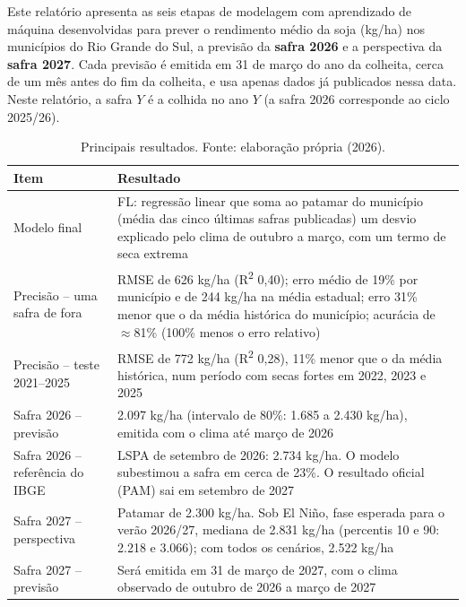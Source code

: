 \documentclass[12pt]{article}
\begin{document}
Este relatório apresenta as seis etapas de modelagem com aprendizado de
máquina desenvolvidas para prever o rendimento médio da soja (kg/ha) nos
municípios do Rio Grande do Sul, a previsão da \textbf{safra 2026} e a
perspectiva da \textbf{safra 2027}. Cada previsão é emitida em 31 de março
do ano da colheita, cerca de um mês antes do fim da colheita, e usa apenas
dados já publicados nessa data. Neste relatório, a safra $Y$ é a colhida no
ano $Y$ (a safra 2026 corresponde ao ciclo 2025/26).

\begin{table}[ht]
\centering
\caption{Principais resultados. Fonte: elaboração própria (2026).}
\label{tab:principais}
\begin{tabular}{|p{3.6cm}|p{10.2cm}|}
\hline
\textbf{Item} & \textbf{Resultado} \\ \hline
Modelo final & FL: regressão linear que soma ao patamar do município
  (média das cinco últimas safras publicadas) um desvio explicado pelo
  clima de outubro a março, com um termo de seca extrema \\ \hline
Precisão -- uma safra de fora & RMSE de 626 kg/ha (R\textsuperscript{2}
  0,40); erro médio de 19\% por município e de 244 kg/ha na média
  estadual; erro 31\% menor que o da média histórica do município;
  acurácia de $\approx$81\% (100\% menos o erro relativo) \\ \hline
Precisão -- teste 2021--2025 & RMSE de 772 kg/ha (R\textsuperscript{2}
  0,28), 11\% menor que o da média histórica, num período com secas
  fortes em 2022, 2023 e 2025 \\ \hline
Safra 2026 -- previsão & 2.097 kg/ha (intervalo de 80\%: 1.685 a 2.430
  kg/ha), emitida com o clima até março de 2026 \\ \hline
Safra 2026 -- referência do IBGE & LSPA de setembro de 2026: 2.734 kg/ha.
  O modelo subestimou a safra em cerca de 23\%. O resultado oficial (PAM)
  sai em setembro de 2027 \\ \hline
Safra 2027 -- perspectiva & Patamar de 2.300 kg/ha. Sob El Niño, fase
  esperada para o verão 2026/27, mediana de 2.831 kg/ha (percentis 10 e
  90: 2.218 e 3.066); com todos os cenários, 2.522 kg/ha \\ \hline
Safra 2027 -- previsão & Será emitida em 31 de março de 2027, com o clima
  observado de outubro de 2026 a março de 2027 \\ \hline
\end{tabular}
\end{table}
\end{document}
